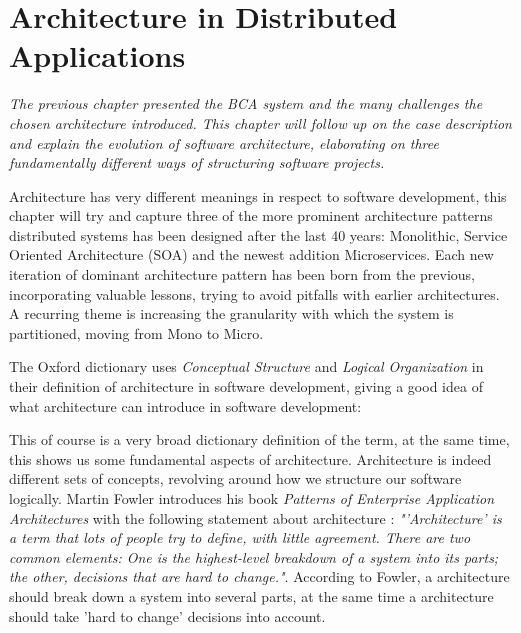 \chapter{Architecture in Distributed Applications}
\label{ch:architecture}

\textit{The previous chapter presented the BCA system and the many challenges the chosen architecture introduced. This chapter will follow up on the case description and explain the evolution of software architecture, elaborating on three fundamentally different ways of structuring software projects.}

Architecture has very different meanings in respect to software development, this chapter will try and capture three of the more prominent architecture patterns distributed systems has been designed after the last 40 years: Monolithic, Service Oriented Architecture (SOA) and the newest addition Microservices. Each new iteration of dominant architecture pattern has been born from the previous, incorporating valuable lessons, trying to avoid pitfalls with earlier architectures. A recurring theme is increasing the granularity with which the system is partitioned, moving from Mono to Micro.

The Oxford dictionary uses \textit{Conceptual Structure} and \textit{Logical Organization} in their definition of architecture in software development, giving a good idea of what architecture can introduce in software development:
 
 
This of course is a very broad dictionary definition of the term, at the same time, this shows us some fundamental aspects of architecture. Architecture is indeed different sets of concepts, revolving around how we structure our software logically. Martin Fowler introduces his book \textit{Patterns of Enterprise Application Architectures} with the following statement about architecture \cite[p.~1]{fowler2002patterns}: \textit{"'Architecture' is a term that lots of people try to define, with little agreement. There are two common elements: One is the highest-level breakdown of a system into its parts; the other, decisions that are hard to change."}. According to Fowler, a architecture should break down a system into several parts, at the same time a architecture should take 'hard to change' decisions into account. 

